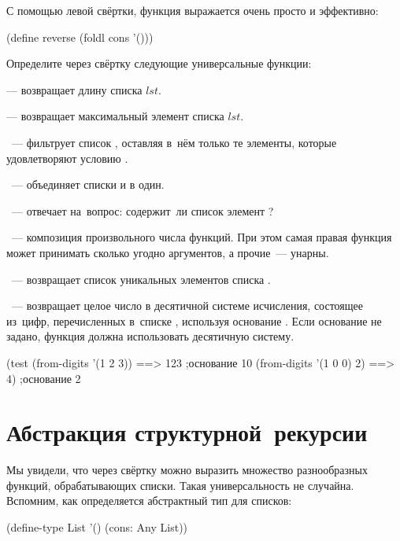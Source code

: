 С помощью левой свёртки, функция  выражается очень просто и эффективно:
\begin{SchemeCode}
(define reverse (foldl cons '()))
\end{SchemeCode}

\begin{Assignment}
Определите через свёртку следующие универсальные функции:

 --- возвращает длину списка $lst$.

 --- возвращает максимальный элемент списка $lst$.

~--- фильтрует список , оставляя в~нём только те элементы, которые удовлетворяют условию .
\medskip

 ~--- объединяет списки  и  в один.
\medskip

 ~--- отвечает на~вопрос: содержит~ли список  элемент ?
\medskip

 ~--- композиция произвольного числа функций. При этом самая правая функция может принимать сколько угодно аргументов, а прочие~--- унарны.
\medskip

\label{remove-duplicates} ~--- возвращает список уникальных элементов списка .
\medskip

~--- возвращает целое число в десятичной системе исчисления, состоящее из~цифр, перечисленных в~списке , используя основание . Если основание не задано, функция должна использовать десятичную систему.
\begin{Specification}
(test 
  (from-digits '(1 2 3))   ==> 123  ;основание 10
  (from-digits '(1 0 0) 2) ==> 4)   ;основание 2
\end{Specification}
\end{Assignment}

\section{Абстракция структурной~рекурсии}%
%
Мы увидели, что через свёртку можно выразить множество разнообразных функций, обрабатывающих списки. Такая универсальность не случайна. Вспомним, как определяется абстрактный тип для списков:
\begin{SchemeCode}
(define-type List 
  '()
  (cons: Any List))
\end{SchemeCode}

